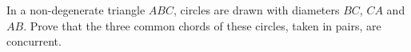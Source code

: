 In a non-degenerate triangle $ABC$, circles are drawn with diameters $BC$, $CA$ and $AB$. Prove that the three common chords of these circles, taken in pairs, are concurrent.
